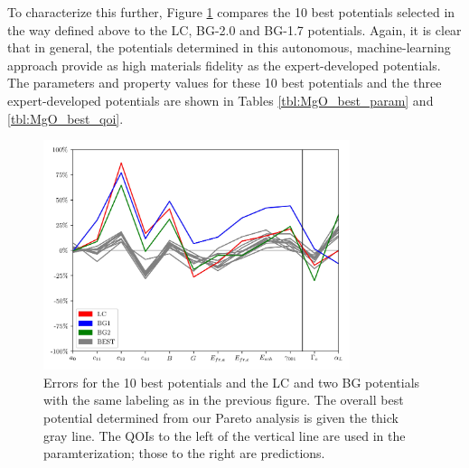 To characterize this further, Figure \ref{fig:MgO_qoi_parallel_plots} compares the 10 best potentials selected in the way defined above to the LC, BG-2.0 and BG-1.7 potentials. Again, it is clear that in general, the potentials determined in this autonomous, machine-learning approach provide as high materials fidelity as the expert-developed potentials. The parameters and property values for these 10 best potentials and the three expert-developed potentials are shown in Tables \ref{tbl:MgO_best_param} and \ref{tbl:MgO_best_qoi}.

\begin{figure}[ht]
	\centering
  \includegraphics[width=0.8\textwidth]{chapter7/MgO_qoi_parallel_plots}
  \caption{Errors for the 10 best potentials and the LC and two BG potentials with the same labeling as in the previous figure. The overall best potential determined from our Pareto analysis is given the thick gray line. The QOIs to the left of the vertical line are used in the paramterization; those to the right are predictions.}
  \label{fig:MgO_qoi_parallel_plots}
\end{figure}

